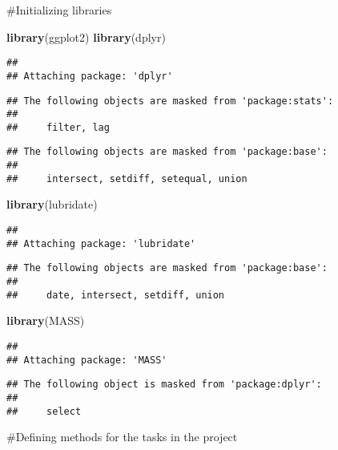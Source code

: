 \documentclass[
]{article}
\author{}
\date{\vspace{-2.5em}}
\newenvironment{Shaded}{\begin{snugshade}}{\end{snugshade}}
\newcommand{\FunctionTok}[1]{\textcolor[rgb]{0.13,0.29,0.53}{\textbf{#1}}}
\newcommand{\NormalTok}[1]{#1}
\begin{document}
\#Initializing libraries

\begin{Shaded}
\begin{Highlighting}[]
\FunctionTok{library}\NormalTok{(ggplot2)}
\FunctionTok{library}\NormalTok{(dplyr)}
\end{Highlighting}
\end{Shaded}

\begin{verbatim}
## 
## Attaching package: 'dplyr'
\end{verbatim}

\begin{verbatim}
## The following objects are masked from 'package:stats':
## 
##     filter, lag
\end{verbatim}

\begin{verbatim}
## The following objects are masked from 'package:base':
## 
##     intersect, setdiff, setequal, union
\end{verbatim}

\begin{Shaded}
\begin{Highlighting}[]
\FunctionTok{library}\NormalTok{(lubridate)}
\end{Highlighting}
\end{Shaded}

\begin{verbatim}
## 
## Attaching package: 'lubridate'
\end{verbatim}

\begin{verbatim}
## The following objects are masked from 'package:base':
## 
##     date, intersect, setdiff, union
\end{verbatim}

\begin{Shaded}
\begin{Highlighting}[]
\FunctionTok{library}\NormalTok{(MASS)     }
\end{Highlighting}
\end{Shaded}

\begin{verbatim}
## 
## Attaching package: 'MASS'
\end{verbatim}

\begin{verbatim}
## The following object is masked from 'package:dplyr':
## 
##     select
\end{verbatim}

\#Defining methods for the tasks in the project
\end{document}
